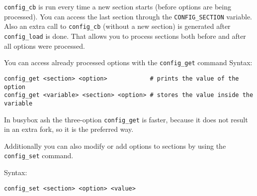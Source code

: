 \texttt{config\_cb} is run every time a new section starts (before options are being
processed). You can access the last section through the \texttt{CONFIG\_SECTION}
variable. Also an extra call to \texttt{config\_cb} (without a new section) is generated
after \texttt{config\_load} is done.
That allows you to process sections both before and after all options were
processed.

You can access already processed options with the \texttt{config\_get} command
Syntax:

\begin{Verbatim}
config_get <section> <option>            # prints the value of the option
config_get <variable> <section> <option> # stores the value inside the variable
\end{Verbatim}

In busybox ash the three-option \texttt{config\_get} is faster, because it does not
result in an extra fork, so it is the preferred way.

Additionally you can also modify or add options to sections by using the
\texttt{config\_set} command.

Syntax:

\begin{Verbatim}
config_set <section> <option> <value>
\end{Verbatim}

